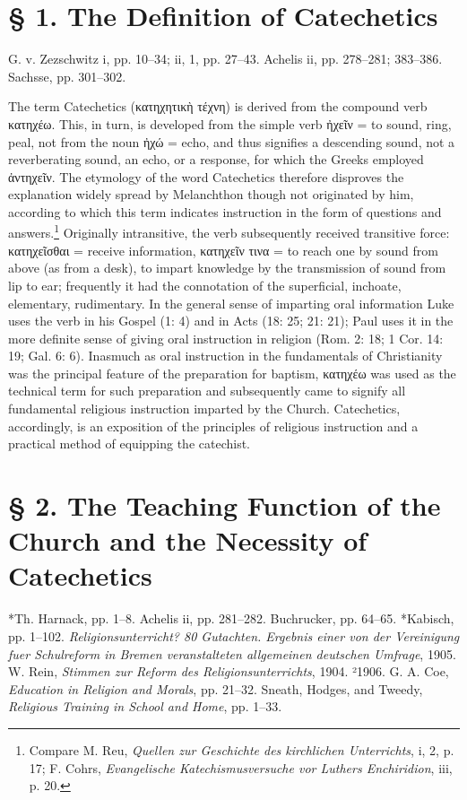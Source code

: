 \section{§ 1. The Definition of Catechetics}

G. v. Zezschwitz i, pp. 10–34; ii, 1, pp. 27–43. Achelis ii, pp. 278–281; 383–386. Sachsse, pp. 301–302.

The term Catechetics (κατηχητικὴ τέχνη) is derived from the compound verb κατηχέω. This, in turn, is developed from the simple verb ἠχεῖν = to sound, ring, peal, not from the noun ἠχώ = echo, and thus signifies a descending sound, not a reverberating sound, an echo, or a response, for which the Greeks employed ἀντηχεῖν. The etymology of the word Catechetics therefore disproves the explanation widely spread by Melanchthon though not originated by him, according to which this term indicates instruction in the form of questions and answers.\footnote{Compare M. Reu, \emph{Quellen zur Geschichte des kirchlichen Unterrichts}, i, 2, p. 17; F. Cohrs, \emph{Evangelische Katechismusversuche vor Luthers Enchiridion}, iii, p. 20.} Originally intransitive, the verb subsequently received transitive force: κατηχεῖσθαι = receive information, κατηχεῖν τινα = to reach one by sound from above (as from a desk), to impart knowledge by the transmission of sound from lip to ear; frequently it had the connotation of the superficial, inchoate, elementary, rudimentary. In the general sense of imparting oral information Luke uses the verb in his Gospel (1: 4) and in Acts (18: 25; 21: 21); Paul uses it in the more definite sense of giving oral instruction in religion (Rom. 2: 18; 1 Cor. 14: 19; Gal. 6: 6). Inasmuch as oral instruction in the fundamentals of Christianity was the principal feature of the preparation for baptism, κατηχέω was used as the technical term for such preparation and subsequently came to signify all fundamental religious instruction imparted by the Church. Catechetics, accordingly, is an exposition of the principles of religious instruction and a practical method of equipping the catechist.

\section[§ 2. The Teaching Function of the Church]{§ 2. The Teaching Function of the Church and the Necessity of Catechetics}

*Th. Harnack, pp. 1–8. Achelis ii, pp. 281–282. Buchrucker, pp. 64–65. *Kabisch, pp. 1–102. \emph{Religionsunterricht? 80 Gutachten. Ergebnis einer von der Vereinigung fuer Schulreform in Bremen veranstalteten allgemeinen deutschen Umfrage}, 1905. W. Rein, \emph{Stimmen zur Reform des Religionsunterrichts}, 1904. ²1906. G. A. Coe, \emph{Education in Religion and Morals}, pp. 21–32. Sneath, Hodges, and Tweedy, \emph{Religious Training in School and Home}, pp. 1–33.

